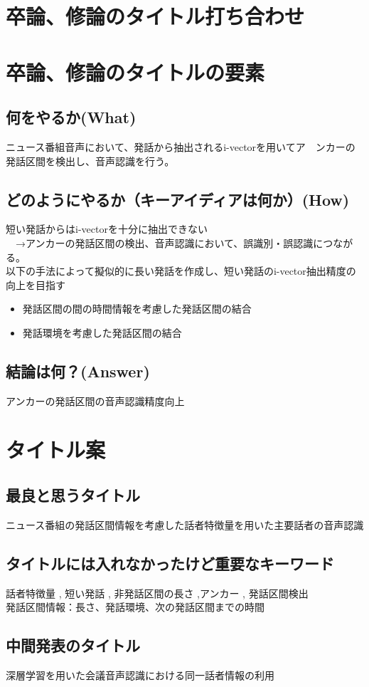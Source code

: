 \documentclass[11pt,a4paper]{jsarticle}
\begin{document}
%
%
\section*{卒論、修論のタイトル打ち合わせ}
\section{卒論、修論のタイトルの要素}
\subsection{何をやるか(What)}
ニュース番組音声において、発話から抽出されるi-vectorを用いてア　ンカーの発話区間を検出し、音声認識を行う。

\subsection{どのようにやるか（キーアイディアは何か）(How)}
短い発話からはi-vectorを十分に抽出できない\\
　→アンカーの発話区間の検出、音声認識において、誤識別・誤認識につながる。\\

以下の手法によって擬似的に長い発話を作成し、短い発話のi-vector抽出精度の向上を目指す
\begin{itemize}
\item 発話区間の間の時間情報を考慮した発話区間の結合
\item 発話環境を考慮した発話区間の結合
\end{itemize}

\subsection{結論は何？(Answer)}
アンカーの発話区間の音声認識精度向上

\section{タイトル案}

\subsection{最良と思うタイトル}
ニュース番組の発話区間情報を考慮した話者特徴量を用いた主要話者の音声認識

\subsection{タイトルには入れなかったけど重要なキーワード}
話者特徴量 , 短い発話 , 非発話区間の長さ ,アンカー , 発話区間検出\\

発話区間情報：長さ、発話環境、次の発話区間までの時間

\subsection{中間発表のタイトル}
深層学習を用いた会議音声認識における同一話者情報の利用


%
%
\end{document}
